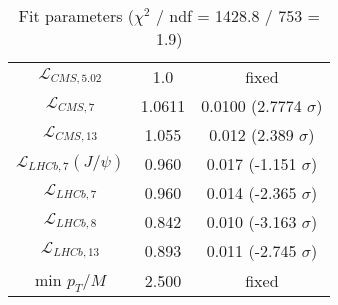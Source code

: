 \begin{table}[h!]
\begin{tabular}{c|c|c}
$\mathcal L_{CMS,5.02}$ & 1.0 & fixed \\
$\mathcal L_{CMS,7}$ & 1.0611 & 0.0100 (2.7774 $\sigma$) \\
$\mathcal L_{CMS,13}$ & 1.055 & 0.012 (2.389 $\sigma$) \\
$\mathcal L_{LHCb,7}(J/\psi)$ & 0.960 & 0.017 (-1.151 $\sigma$) \\
$\mathcal L_{LHCb,7}$ & 0.960 & 0.014 (-2.365 $\sigma$) \\
$\mathcal L_{LHCb,8}$ & 0.842 & 0.010 (-3.163 $\sigma$) \\
$\mathcal L_{LHCb,13}$ & 0.893 & 0.011 (-2.745 $\sigma$) \\
min $p_T/M$ & 2.500 & fixed \\
\end{tabular}
\caption{Fit parameters ($\chi^2$ / ndf = 1428.8 / 753 = 1.9)}
\end{table}
